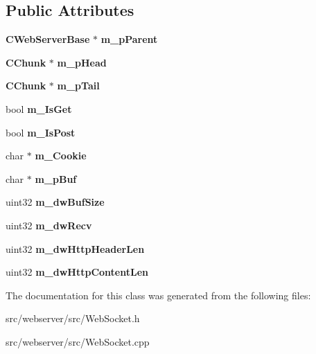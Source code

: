\subsection*{Public Attributes}
\begin{DoxyCompactItemize}
\item 
{\bf CWebServerBase} $\ast$ {\bfseries m\_\-pParent}\label{classCWebSocket_aa7eddb5530d7e5777d057b257ecbe881}

\item 
{\bf CChunk} $\ast$ {\bfseries m\_\-pHead}\label{classCWebSocket_a235d4d00649c69fafbb7290bbba2ee8d}

\item 
{\bf CChunk} $\ast$ {\bfseries m\_\-pTail}\label{classCWebSocket_a047b5909e8873465cfd1633af3bb8d33}

\item 
bool {\bfseries m\_\-IsGet}\label{classCWebSocket_a0f0605fc569023b10873c3834e73a75f}

\item 
bool {\bfseries m\_\-IsPost}\label{classCWebSocket_abe16a8f7de4bfe81c81fbec4792a5536}

\item 
char $\ast$ {\bfseries m\_\-Cookie}\label{classCWebSocket_a1a68c62fd7969f1de48d00e244805c3e}

\item 
char $\ast$ {\bfseries m\_\-pBuf}\label{classCWebSocket_ab0babbd04b0e31bbd36d2b2bb2269e98}

\item 
uint32 {\bfseries m\_\-dwBufSize}\label{classCWebSocket_ac223a3a99e7bef45ca7f696ddf0b436c}

\item 
uint32 {\bfseries m\_\-dwRecv}\label{classCWebSocket_a970700ead9582940c978bfad519b04f8}

\item 
uint32 {\bfseries m\_\-dwHttpHeaderLen}\label{classCWebSocket_a1069604caac1a636aa93522e263efae6}

\item 
uint32 {\bfseries m\_\-dwHttpContentLen}\label{classCWebSocket_a5932995e28dc0022ec2a38a36d22ddeb}

\end{DoxyCompactItemize}


The documentation for this class was generated from the following files:\begin{DoxyCompactItemize}
\item 
src/webserver/src/WebSocket.h\item 
src/webserver/src/WebSocket.cpp\end{DoxyCompactItemize}
